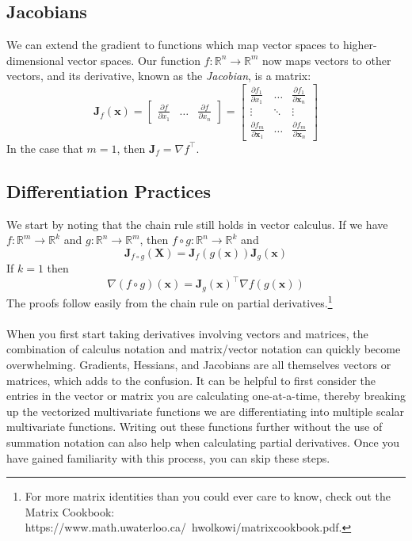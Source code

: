 \documentclass{article}
\begin{document}
\subsection{Jacobians}
We can extend the gradient to functions which map vector spaces to higher-dimensional vector spaces. Our function $f: \mathbb{R}^n \rightarrow \mathbb{R}^m$ now maps vectors to other vectors, and its derivative, known as the \textit{Jacobian}, is a matrix: $$\mathbf{J}_f(\mathbf{x}) = \begin{bmatrix} \frac{\partial f}{\partial x_1} & \hdots & \frac{\partial f}{\partial x_n} \end{bmatrix} = \begin{bmatrix} \frac{\partial f_1}{\partial x_1} & \hdots & \frac{\partial f_1}{\partial \mathbf{x}_n} \\ \vdots & \ddots & \vdots \\ \frac{\partial f_m}{\partial \mathbf{x}_1} & \hdots & \frac{\partial f_m}{\partial \mathbf{x}_n} \end{bmatrix}$$ In the case that $m = 1$, then $\mathbf{J}_f = \nabla f^{\top}$.

\subsection{Differentiation Practices}
We start by noting that the chain rule still holds in vector calculus. If we have $f: \mathbb{R}^m \rightarrow \mathbb{R}^k$ and $g: \mathbb{R}^n \rightarrow \mathbb{R}^m$, then $f \circ g: \mathbb{R}^n \rightarrow \mathbb{R}^k$ and $$\mathbf{J}_{f \circ g}(\mathbf{X}) = \mathbf{J}_f(g(\mathbf{x}))\mathbf{J}_g(\mathbf{x})$$ If $k = 1$ then $$\nabla (f \circ g)(\mathbf{x}) = \mathbf{J}_g(\mathbf{x})^{\top}\nabla f(g(\mathbf{x}))$$ The proofs follow easily from the chain rule on partial derivatives.\footnote{For more matrix identities than you could ever care to know, check out the Matrix Cookbook: https://www.math.uwaterloo.ca/~hwolkowi/matrixcookbook.pdf.}\\\\
When you first start taking derivatives involving vectors and matrices, the combination of calculus notation and matrix/vector notation can quickly become overwhelming. Gradients, Hessians, and Jacobians are all themselves vectors or matrices, which adds to the confusion. It can be helpful to first consider the entries in the vector or matrix you are calculating one-at-a-time, thereby breaking up the vectorized multivariate functions we are differentiating into multiple scalar multivariate functions. Writing out these functions further without the use of summation notation can also help when calculating partial derivatives. Once you have gained familiarity with this process, you can skip these steps.
\end{document}
